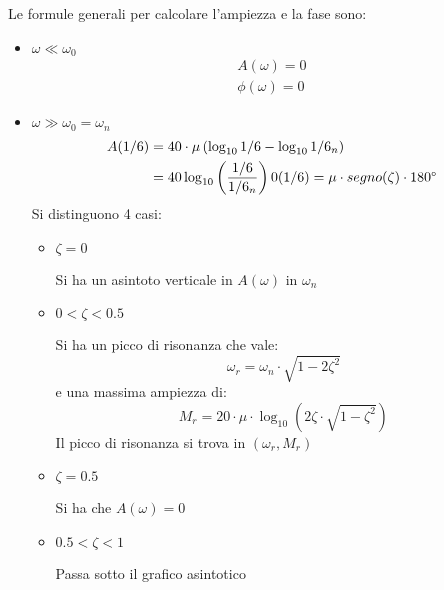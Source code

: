 \documentclass[a4paper]{article}
\begin{document}
\vspace{1em}
\noindent
Le formule generali per calcolare l'ampiezza e la fase sono:
\begin{itemize}
  \item \( \omega \ll \omega_0 \) 
    \[
    \begin{aligned}
      A(\omega) = 0\\
      \phi(\omega) = 0
    \end{aligned}
    \] 
  \item \( \omega \gg \omega_0 = \omega_n \) 
    \[
    \begin{aligned}
      A(1/6) &= 40 \cdot \mu \left( \log_{10} 1/6 - \log_{10} 1/6_n \right) \\
                &= 40 \log_{10} \left( \frac{1/6}{1/6_n} \right) 
      0(1/6) = \mu \cdot segno(\zeta) \cdot 180\degree
    \end{aligned}
    \]
    Si distinguono 4 casi:
    \begin{itemize}
      \item \( \zeta = 0 \) 

        Si ha un asintoto verticale in \( A(\omega) \) in \( \omega_n \)

      \item \( 0 < \zeta < 0.5 \)

        Si ha un picco di risonanza che vale:
        \[
          \omega_r = \omega_n \cdot \sqrt{1 - 2 \zeta^2}
        \] 
        e una massima ampiezza di:
        \[
          M_r = 20 \cdot \mu \cdot \log_{10} \left( 2 \zeta \cdot \sqrt{1 - \zeta^2} \right)
        \]
        Il picco di risonanza si trova in \( \left( \omega_r, M_r \right)  \) 

      \item \( \zeta = 0.5 \)

        Si ha che \( A(\omega) = 0\) 

      \item \( 0.5 < \zeta < 1 \) 

        Passa sotto il grafico asintotico
    \end{itemize}
\end{itemize}
\end{document}
